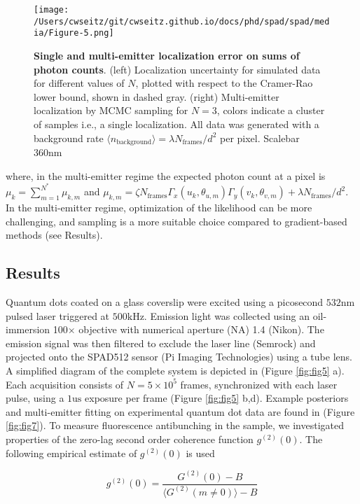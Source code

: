 \begin{figure*}[t]
\centering
\texttt{[image: /Users/cwseitz/git/cwseitz.github.io/docs/phd/spad/spad/media/Figure-5.png]}
\caption{\textbf{Single and multi-emitter localization error on sums of photon counts}. (left) Localization uncertainty for simulated data for different values of $N$, plotted with respect to the Cramer-Rao lower bound, shown in dashed gray. (right) Multi-emitter localization by MCMC sampling for $N=3$, colors indicate a cluster of samples i.e., a single localization. All data was generated with a background rate $\langle n_{\mathrm{background}} \rangle = \lambda N_{\mathrm{frames}}/d^{2}$ per pixel. Scalebar 360nm}
\label{fig:fig6}
\end{figure*}   

where, in the multi-emitter regime the expected photon count at a pixel is $\mu_{k} = \sum_{m=1}^{N^{*}} \mu_{k,m}$ and $\mu_{k,m}=\zeta N_{\mathrm{frames}}\Gamma_{x}(u_k,\theta_{u,m})\Gamma_{y}(v_k,\theta_{v,m}) + \lambda N_{\mathrm{frames}}/d^{2}$. In the multi-emitter regime, optimization of the likelihood can be more challenging, and sampling is a more suitable choice compared to gradient-based methods (see Results). 


\subsection{Results}

Quantum dots coated on a glass coverslip were excited using a picosecond $532\mathrm{nm}$ pulsed laser triggered at $500\mathrm{kHz}$. Emission light was collected using an oil-immersion 100$\times$ objective with numerical aperture (NA) 1.4 (Nikon). The emission signal was then filtered to exclude the laser line (Semrock) and projected onto the SPAD512 sensor (Pi Imaging Technologies) using a tube lens. A simplified diagram of the complete system is depicted in (Figure \ref{fig:fig5} a). Each acquisition consists of $N=5\times 10^{5}$ frames, synchronized with each laser pulse, using a $1\mathrm{us}$ exposure per frame (Figure \ref{fig:fig5} b,d). Example posteriors and multi-emitter fitting on experimental quantum dot data are found in (Figure \ref{fig:fig7}). To measure fluorescence antibunching in the sample, we investigated properties of the zero-lag second order coherence function $g^{(2)}(0)$. The following empirical estimate of $g^{(2)}(0)$ is used \parencite{Israel2017}

\begin{equation}
g^{(2)}(0) = \frac{G^{(2)}(0)-B}{\langle G^{(2)}(m\neq 0)\rangle -B}
\end{equation}

